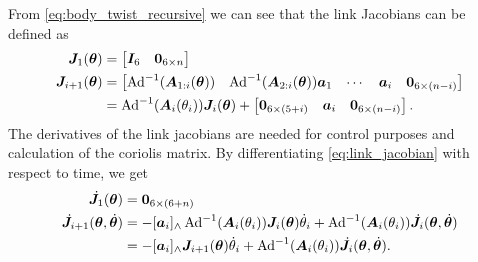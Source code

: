 From \autoref{eq:body_twist_recursive} we can see that the link Jacobians can be
defined as
\begin{subequations}
    \label{eq:link_jacobian}
\begin{align}
    \bm{J}_1(\bm{\theta}) &= \begin{bmatrix} \bm{I}_6 & \bm{0}_{6 \times n} \end{bmatrix} \\
        \bm{J}_{i+1}(\bm{\theta}) &= \begin{bmatrix}
            \operatorname{Ad}^{-1}(\bm{A}_{1:i}(\bm{\theta}))  &  \operatorname{Ad}^{-1}(\bm{A}_{2:i}(\bm{\theta})) \bm{a}_1 &
            \cdots & \bm{a}_i & \bm{0}_{6 \times (n-i)}
        \end{bmatrix} \\
    &= \operatorname{Ad}^{-1}(\bm{A}_i(\theta_i)) \bm{J}_i(\bm{\theta}) + \begin{bmatrix}
        \bm{0}_{6 \times (5+i)} & \bm{a}_i & \bm{0}_{6 \times (n-i)}
    \end{bmatrix}.
\end{align}
\end{subequations}
The derivatives of the link jacobians are needed for control purposes and
calculation of the coriolis matrix. By differentiating \autoref{eq:link_jacobian}
with respect to time, we get
\begin{subequations}
\begin{align}
    \dot{\bm{J}}_1(\bm{\theta}) &= \bm{0}_{6\times(6+n)} \\
    \dot{\bm{J}}_{i+1}(\bm{\theta},\dot{\bm{\theta}}) &= -[\bm{a}_i]_{\wedge} \operatorname{Ad}^{-1}(\bm{A}_i(\theta_i))
        \bm{J}_i(\bm{\theta})\dot{\theta}_i + \operatorname{Ad}^{-1}(\bm{A}_i(\theta_i))\dot{\bm{J}}_i(\bm{\theta},\dot{\bm{\theta}}) \\
    &= -[\bm{a}_i]_{\wedge}\bm{J}_{i+1}(\bm{\theta})\dot{\theta}_i +
        \operatorname{Ad}^{-1}(\bm{A}_i(\theta_i))\dot{\bm{J}}_i(\bm{\theta},\dot{\bm{\theta}}).
\end{align}
\end{subequations}

